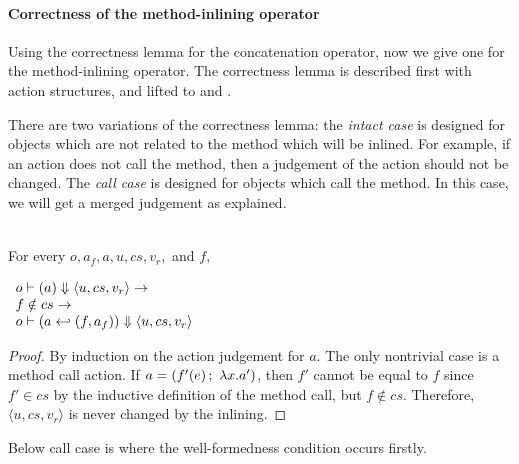 \paragraph{Correctness of the method-inlining operator}

Using the correctness lemma for the concatenation operator, now we
give one for the method-inlining operator. The correctness lemma is
described first with action structures, and lifted to \Substep{} and
\Substeps{}.

There are two variations of the correctness lemma: the \emph{intact
  case} is designed for objects which are not related to the method
which will be inlined. For example, if an action does not call the
method, then a judgement of the action should not be changed. The
\emph{call case} is designed for objects which call the method. In
this case, we will get a merged judgement as explained.

\begin{lemma}
  \label{lem-inlinedm-action-intact}
  \mbox{}\\
  For every $o, a_f, a, u, cs, v_r,$ and $f,$
  \begin{center}
    \begin{math}
      \begin{array}{l}
        \semact{o}{a}{u}{cs}{v_r} \to \\
        f \notin cs \to \\
        \semact{o}{\inlinedm{a}{(f, a_f)}}{u}{cs}{v_r}
      \end{array}
    \end{math}
  \end{center}
\end{lemma}
\begin{proof}
  By induction on the action judgement for $a$. The only nontrivial
  case is a method call action. If $a = (\actcall{x}{f'}{e}{a'})$,
  then $f'$ cannot be equal to $f$ since $f' \in cs$ by the inductive
  definition of the method call, but $f \notin cs$. Therefore,
  $\langle u, cs, v_r \rangle$ is never changed by the inlining.
\end{proof}

Below call case is where the well-formedness condition occurs firstly.

